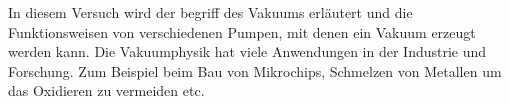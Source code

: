 In diesem Versuch wird der begriff des Vakuums erläutert und die Funktionsweisen von verschiedenen Pumpen, mit denen ein Vakuum erzeugt werden kann. Die Vakuumphysik hat viele Anwendungen in der Industrie und Forschung. Zum Beispiel beim Bau von Mikrochips, Schmelzen von Metallen um das Oxidieren zu vermeiden etc.